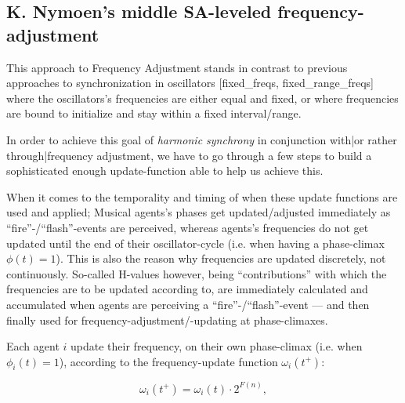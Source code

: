 	
	
	

	
	\subsection{K. Nymoen's middle SA-leveled frequency-adjustment}
	
	This approach to Frequency Adjustment stands in contrast to previous approaches to synchronization in oscillators [fixed\_freqs, fixed\_range\_freqs] where the oscillators's frequencies are either equal and fixed, or where frequencies are bound to initialize and stay within a fixed interval/range.
	
	In order to achieve this goal of \textit{harmonic synchrony} in conjunction with|or rather through|frequency adjustment, we have to go through a few steps to build a sophisticated enough update-function able to help us achieve this.
	
	When it comes to the temporality and timing of when these update functions are used and applied; Musical agents's phases get updated/adjusted immediately as ``fire''-/``flash''-events are perceived, whereas agents's frequencies do not get updated until the end of their oscillator-cycle (i.e. when having a phase-climax $\phi(t)=1$). This is also the reason why frequencies are updated discretely, not continuously. So-called H-values however, being ``contributions'' with which the frequencies are to be updated according to, are immediately calculated and accumulated when agents are perceiving a ``fire''-/``flash''-event — and then finally used for frequency-adjustment/-updating at phase-climaxes.
			
	Each agent $i$ update their frequency, on their own phase-climax (i.e. when $\phi_i(t)=1$), according to the frequency-update function $\omega_i(t^+)$:
	
	\begin{equation}
		\omega_i(t^+) = \omega_i(t) \cdot 2^{F(n)},
	\end{equation}
	
